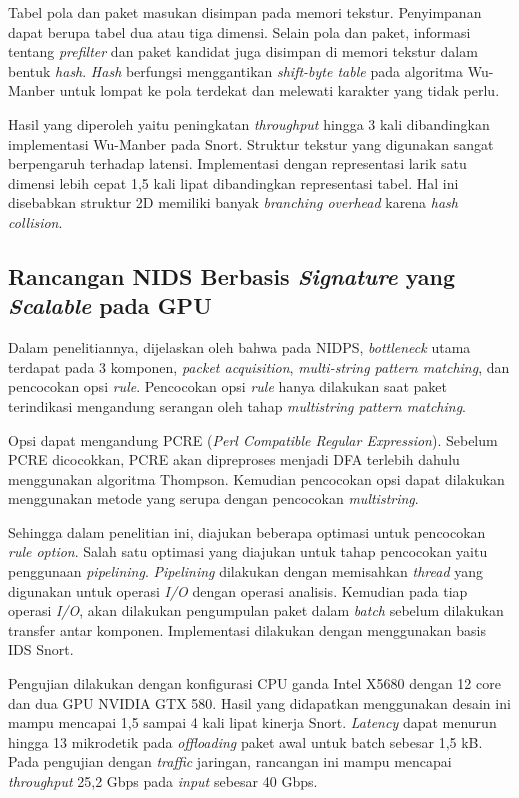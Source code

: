     Tabel pola dan paket masukan disimpan pada memori tekstur. Penyimpanan dapat berupa tabel dua atau tiga dimensi. Selain pola dan paket, informasi tentang \emph{prefilter} dan paket kandidat juga disimpan di memori tekstur dalam bentuk \emph{hash}. \emph{Hash} berfungsi menggantikan \emph{shift-byte table} pada algoritma Wu-Manber untuk lompat ke pola terdekat dan melewati karakter yang tidak perlu.

    Hasil yang diperoleh yaitu peningkatan \emph{throughput} hingga 3 kali dibandingkan implementasi Wu-Manber pada Snort. Struktur tekstur yang digunakan sangat berpengaruh terhadap latensi. Implementasi dengan representasi larik satu dimensi lebih cepat 1,5 kali lipat dibandingkan representasi tabel. Hal ini disebabkan struktur 2D memiliki banyak \emph{branching overhead} karena \emph{hash collision}.

  \subsection{Rancangan NIDS Berbasis \emph{Signature} yang \emph{Scalable} pada GPU}

    Dalam penelitiannya, dijelaskan oleh \cite{kargus2012} bahwa pada NIDPS, \emph{bottleneck} utama terdapat pada 3 komponen, \emph{packet acquisition}, \emph{multi-string pattern matching}, dan pencocokan opsi \emph{rule}. Pencocokan opsi \emph{rule} hanya dilakukan saat paket terindikasi mengandung serangan oleh tahap \emph{multistring pattern matching}. 
    
    Opsi dapat mengandung PCRE (\emph{Perl Compatible Regular Expression}). Sebelum PCRE dicocokkan, PCRE akan dipreproses menjadi DFA terlebih dahulu menggunakan algoritma Thompson. Kemudian pencocokan opsi dapat dilakukan menggunakan metode yang serupa dengan pencocokan \emph{multistring}.

    Sehingga dalam penelitian ini, diajukan beberapa optimasi untuk pencocokan \emph{rule option}. Salah satu optimasi yang diajukan untuk tahap pencocokan yaitu penggunaan \emph{pipelining}. \emph{Pipelining} dilakukan dengan memisahkan \emph{thread} yang digunakan untuk operasi \emph{I/O} dengan operasi analisis. Kemudian pada tiap operasi \emph{I/O}, akan dilakukan pengumpulan paket dalam \emph{batch} sebelum dilakukan transfer antar komponen. Implementasi dilakukan dengan menggunakan basis IDS Snort.

    Pengujian dilakukan dengan konfigurasi CPU ganda Intel X5680 dengan 12 core dan dua GPU NVIDIA GTX 580. Hasil yang didapatkan menggunakan desain ini mampu mencapai 1,5 sampai 4 kali lipat kinerja Snort. \emph{Latency} dapat menurun hingga 13 mikrodetik pada \emph{offloading} paket awal untuk batch sebesar 1,5 kB. Pada pengujian dengan \emph{traffic} jaringan, rancangan ini mampu mencapai \emph{throughput} 25,2 Gbps pada \emph{input} sebesar 40 Gbps.

